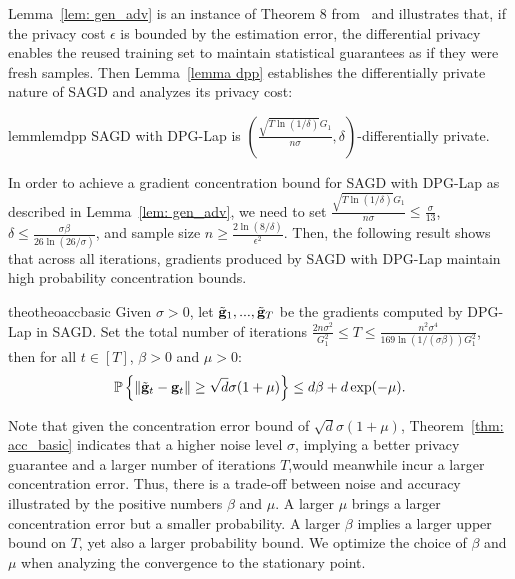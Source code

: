 \documentclass[11pt]{article}
\begin{document}
Lemma~\ref{lem: gen_adv} is an instance of Theorem 8 from~\cite{dwfe15} and illustrates that, if the privacy cost $\epsilon$ is bounded by the estimation error, the differential privacy enables the reused training set to maintain statistical guarantees as if they were fresh samples. 
Then Lemma~\ref{lemma dpp} establishes the differentially private nature of \textsc{SAGD} and analyzes its privacy cost:
\begin{restatable}{lemm}{lemdpp}
\label{lemma dpp}
	\textsc{SAGD} with DPG-Lap is 
	$(\frac{\sqrt{T \ln(1/\delta)} G_1}{n\sigma}, \delta)$-differentially private. 
\end{restatable}  
In order to achieve a gradient concentration bound for \textsc{SAGD} with DPG-Lap as described in Lemma~\ref{lem: gen_adv}, we need to set $\frac{\sqrt{T \ln(1/\delta)} G_1}{n\sigma} \leq \frac{\sigma}{13}$, $\delta \leq \frac{\sigma \beta}{26 \ln(26/\sigma)}$, and  sample size $n \geq \frac{2\ln(8/\delta)}{\epsilon^2}$. 
Then, the following result shows that across all iterations, gradients produced by \textsc{SAGD} with DPG-Lap maintain high probability concentration bounds.
\begin{restatable}{theo}{theoaccbasic}
\label{thm: acc_basic}
Given $\sigma > 0$, let $\tilde {\mathbf{g}}_1,...,  \tilde {\mathbf{g}}_T$ be the gradients computed by DPG-Lap in \textsc{SAGD}. Set the total number of iterations $ \frac{2n\sigma^2}{G_1^2}\leq T \leq \frac{n^2 \sigma^4}{169 \ln(1/(\sigma \beta))G_1^2}$, then for all $t \in [T]$, $\beta >0$ and $\mu > 0$:
    \begin{equation*}
    \mathbb{P}\left\{\|\tilde {\mathbf{g}}_t - \mathbf{g}_t\| \geq \sqrt{d}\sigma(1+\mu)\right\} \leq d\beta + d\exp(-\mu).
    \end{equation*}
\end{restatable}
Note that given the concentration error bound of $\sqrt{d}\sigma(1+\mu)$, Theorem~\ref{thm: acc_basic} indicates that a higher noise level $\sigma$, implying a better privacy guarantee and a larger number of iterations $T$,would meanwhile incur a larger concentration error.
Thus, there is a trade-off between noise and accuracy illustrated by the positive numbers $\beta$ and $\mu$.
A larger $\mu$ brings a larger concentration error but a smaller probability. 
A larger $\beta$ implies a larger upper bound on $T$, yet also a larger probability bound. 
We optimize the choice of $\beta$ and $\mu$ when analyzing the convergence to the stationary point.
\end{document}
